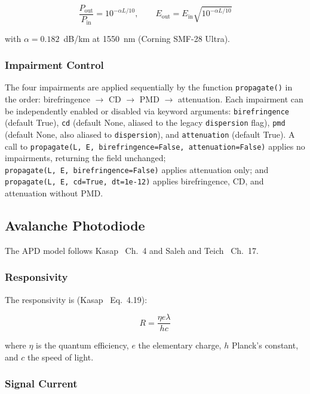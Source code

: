 \documentclass[11pt,a4paper]{article}
\begin{document}
\begin{equation}
  \frac{P_{\text{out}}}{P_{\text{in}}} = 10^{-\alpha L/10},
  \qquad
  E_{\text{out}} = E_{\text{in}} \sqrt{10^{-\alpha L/10}}
  \label{eq:att}
\end{equation}

with $\alpha = 0.182$~dB/km at 1550~nm (Corning SMF-28 Ultra).

\subsubsection{Impairment Control}

The four impairments are applied sequentially by the function
\texttt{propagate()} in the order: birefringence $\to$ CD $\to$
PMD $\to$ attenuation.  Each impairment can be independently
enabled or disabled via keyword arguments:
\texttt{birefringence} (default True), \texttt{cd} (default None,
aliased to the legacy \texttt{dispersion} flag), \texttt{pmd}
(default None, also aliased to \texttt{dispersion}), and
\texttt{attenuation} (default True).  A call to
\texttt{propagate(L,\ E,\ birefringence=False,\ attenuation=False)}
applies no impairments, returning the field unchanged;
\texttt{propagate(L,\ E,\ birefringence=False)} applies attenuation
only; and \texttt{propagate(L,\ E,\ cd=True,\ dt=1e-12)} applies
birefringence, CD, and attenuation without PMD.

\subsection{Avalanche Photodiode}

The APD model follows Kasap~\cite{kasap} Ch.~4 and
Saleh and Teich~\cite{saleh} Ch.~17.

\subsubsection{Responsivity}

The responsivity is (Kasap~\cite{kasap} Eq.~4.19):

\begin{equation}
  R = \frac{\eta e \lambda}{h c}
  \label{eq:responsivity}
\end{equation}

where $\eta$ is the quantum efficiency, $e$ the elementary charge,
$h$ Planck's constant, and $c$ the speed of light.

\subsubsection{Signal Current}
\end{document}
